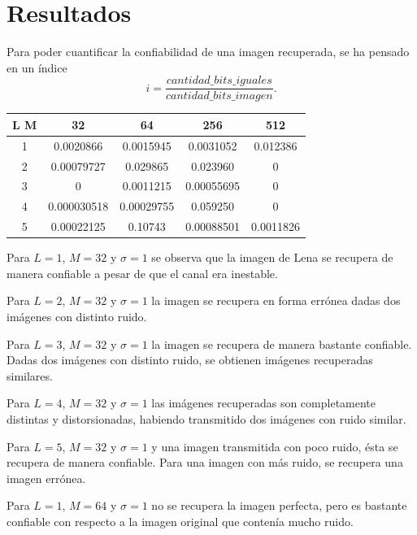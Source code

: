 \documentclass[10pt,journal,compsoc]{IEEEtran}
\begin{document}
\section{Resultados}

Para poder cuantificar la confiabilidad de una imagen recuperada, se ha pensado en un \'indice 
\begin{equation}
 i=\frac{cantidad\_bits\_iguales}{cantidad\_bits\_imagen}   .
\nonumber
\end{equation}


\begin{table}[ht] 
\centering  
\begin{tabular}{c | c | c | c | c}  
\hline\hline
L   M & 32 & 64 & 256 & 512 \\ \hline 
1 & 0.0020866 & 0.0015945 & 0.0031052 & 0.012386 \\  
2 & 0.00079727 & 0.029865 & 0.023960  & 0 \\ 
3 & 0 & 0.0011215 & 0.00055695 & 0\\ 
4 & 0.000030518 & 0.00029755 & 0.059250 & 0 \\ 
5 & 0.00022125 & 0.10743 & 0.00088501 & 0.0011826  \\ [1ex]  
\hline 
\end{tabular} 
\label{table:nonlin}  
\end{table} 


Para $L = {1}$, $M = {32}$ y $\sigma = 1$ se observa que la imagen de Lena se recupera de manera confiable a pesar de que el canal era inestable.

Para $L = {2}$, $M = {32}$ y $\sigma = 1$ la imagen se recupera en forma err\'onea dadas dos im\'agenes con distinto ruido.

Para $L = {3}$, $M = {32}$ y $\sigma = 1$ la imagen se recupera de manera bastante confiable. Dadas dos im\'agenes con distinto ruido, se obtienen im\'agenes recuperadas similares.

Para $L = {4}$, $M = {32}$ y $\sigma = 1$ las im\'agenes recuperadas son completamente distintas y distorsionadas, habiendo transmitido dos im\'agenes con ruido similar.

Para $L = {5}$, $M = {32}$ y $\sigma = 1$ y una imagen transmitida con poco ruido, \'esta se recupera de manera confiable. Para una imagen con m\'as ruido, se recupera una imagen err\'onea.

Para $L = {1}$, $M = {64}$ y $\sigma = 1$ no se recupera la imagen perfecta, pero es bastante confiable con respecto a la imagen original que conten\'ia mucho ruido.
\end{document}
